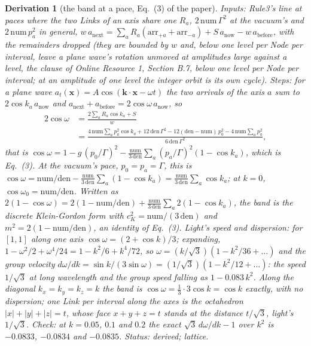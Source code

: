 \documentclass[pdflatex,sn-mathphys-num]{sn-jnl}
\newcommand{\num}{\mathrm{num}}
\newcommand{\den}{\mathrm{den}}
\newcommand{\anow}{a_{\mathrm{now}}}
\newcommand{\abefore}{a_{\mathrm{before}}}
\newcommand{\anext}{a_{\mathrm{next}}}
\theoremstyle{thmstyleone}
\newtheorem{derivation}{Derivation}
\begin{document}
\begin{derivation}[the band at a pace, Eq.~(3) of the paper]
\emph{Inputs:} Rule3's line at paces where the two Links of an axis share one $R_a$, $2\,\num\,\Gamma^2$ at the vacuum's and $2\,\num\,p_a^2$ in general, $w\,\anext = \sum_a R_a(\mathrm{arr}_{+a} + \mathrm{arr}_{-a}) + S\,\anow - w\,\abefore$, with the remainders dropped (they are bounded by $w$ and, below one level per Node per interval, leave a plane wave's rotation unmoved at amplitudes large against a level, the clause of Online Resource 1, Section B.7, below one level per Node per interval; at an amplitude of one level the integer orbit is its own cycle). \emph{Steps:} for a plane wave $a_t(\mathbf x) = A\cos(\mathbf k \cdot \mathbf x - \omega t)$ the two arrivals of the axis $a$ sum to $2\cos k_a\,\anow$ and $\anext + \abefore = 2\cos\omega\,\anow$, so
\begin{align*}
2\cos\omega &= \frac{2\sum_a R_a\cos k_a + S}{w}\\
&= \frac{4\,\num\sum_a p_a^2\cos k_a + 12\,\den\,\Gamma^2 - 12(\den - \num)\,p_0^2 - 4\,\num\sum_a p_a^2}{6\,\den\,\Gamma^2},
\end{align*}
that is $\cos\omega = 1 - g\,(p_0 / \Gamma)^2 - \frac{\num}{3\,\den}\sum_a (p_a / \Gamma)^2(1 - \cos k_a)$, which is Eq.~(3). At the vacuum's pace, $p_0 = p_a = \Gamma$, this is $\cos\omega = \num / \den - \frac{\num}{3\,\den}\sum_a(1 - \cos k_a) = \frac{\num}{3\,\den}\sum_a\cos k_a$; at $k = 0$, $\cos\omega_0 = \num / \den$. Written as $2(1 - \cos\omega) = 2(1 - \num / \den) + \frac{\num}{3\,\den}\sum_a 2(1 - \cos k_a)$, the band is the discrete Klein-Gordon form with $c_K^2 = \num / (3\,\den)$ and $m^2 = 2(1 - \num / \den)$, an identity of Eq.~(3). \emph{Light's speed and dispersion:} for $[1, 1]$ along one axis $\cos\omega = (2 + \cos k) / 3$; expanding, $1 - \omega^2 / 2 + \omega^4 / 24 = 1 - k^2 / 6 + k^4 / 72$, so $\omega = (k / \sqrt 3)(1 - k^2 / 36 + \dots)$ and the group velocity $d\omega / dk = \sin k / (3\sin\omega) = (1 / \sqrt 3)(1 - k^2 / 12 + \dots)$: the speed $1 / \sqrt 3$ at long wavelength and the group speed falling as $1 - 0.083\,k^2$. Along the diagonal $k_x = k_y = k_z = k$ the band is $\cos\omega = \tfrac13 \cdot 3\cos k = \cos k$ exactly, with no dispersion; one Link per interval along the axes is the octahedron $|x| + |y| + |z| = t$, whose face $x + y + z = t$ stands at the distance $t / \sqrt 3$, light's $1 / \sqrt 3$. \emph{Check:} at $k = 0.05$, $0.1$ and $0.2$ the exact $\sqrt 3\,d\omega / dk - 1$ over $k^2$ is $-0.0833$, $-0.0834$ and $-0.0835$.
 \emph{Status:} derived; lattice.
\end{derivation}
\end{document}

